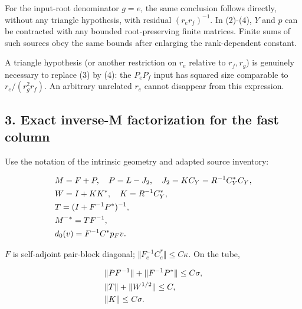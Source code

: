 For the input-root denominator \(g=e\), the same conclusion follows
directly, without any triangle hypothesis, with residual
\((r_{e} r_{f})^{-1}\). In (2)-(4), \(Y\) and \(p\) can be contracted
with any bounded root-preserving finite matrices. Finite sums of such
sources obey the same bounds after enlarging the rank-dependent
constant.

A triangle hypothesis (or another restriction on \(r_{e}\) relative to
\(r_{f},r_{g}\)) is genuinely necessary to replace (3) by (4): the
\(P_{e} P_{f}\) input has squared size comparable to
\(r_{e}/(r_{g}^{2} r_{f})\). An arbitrary unrelated \(r_{e}\) cannot
disappear from this expression.

\subsection{3. Exact inverse-M factorization for the fast
column}\label{e-exact-inverse-m-factorization-for-the-fast-column}

Use the notation of the intrinsic geometry and adapted source inventory:

\begin{gather*}
\begin{aligned}
& M=F+P, \quad  P=L-J_{2}, \quad  J_{2}=K C_{Y}=R^{-1} C_{Y}^{*} C_{Y}, \\
& W=I+K K^{*}, \quad  K=R^{-1} C_{Y}^{*}, \\
& T=(I+F^{-1} P^{*})^{-1}, \\
& M^{-*}=T F^{-1}, \\
& d_{0}(v)=F^{-1} C^{*} p_{F} v.
\end{aligned}\notag
\end{gather*}

\(F\) is self-adjoint pair-block diagonal;
\(\Vert F_{e}^{-1} C_{e}^{*}\Vert \le C \kappa\). On the tube,

\begin{gather*}
\begin{aligned}
& \Vert P F^{-1}\Vert +\Vert F^{-1} P^{*}\Vert  \le  C \sigma , \\
& \Vert T\Vert +\Vert W^{1/2}\Vert  \le  C, \\
& \Vert K\Vert  \le  C \sigma .
\end{aligned}\notag
\end{gather*}

